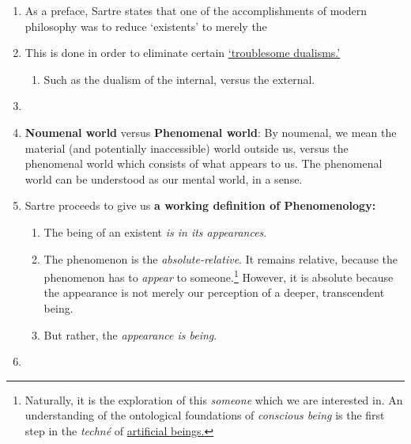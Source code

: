 \begin{enumerate}
  \item As a preface, Sartre states that one of the accomplishments of modern philosophy was to reduce \enquote*{existents} to merely the 
  \item This is done in order to eliminate certain \href{https://plato.stanford.edu/entries/dualism/#ProForDua}{\enquote*{troublesome dualisms.}}
  \begin{enumerate}
    \item Such as the dualism of the internal, versus the external.
  \end{enumerate}
  \item {}
  \item \textbf{Noumenal world} versus \textbf{Phenomenal world}:
  By noumenal, we mean the material (and potentially inaccessible) world outside us, versus the phenomenal world which consists of what appears to us. The phenomenal world can be understood as our mental world, in a sense.
  \item Sartre proceeds to give us \textbf{a working definition of Phenomenology:}
  \begin{enumerate}
    \item The being of an existent \emph{is in its appearances}. 
    \item The phenomenon is the \emph{absolute-relative}.
    It remains relative, because the phenomenon has to \emph{appear} to someone.\footnote{Naturally, it is the exploration of this \emph{someone} which we are interested in. An understanding of the ontological foundations of \emph{conscious being} is the first step in the \emph{techné} of \href{https://plato.stanford.edu/entries/artificial-intelligence/}{artificial beings.}} However, it is absolute because the appearance is not merely our perception of a deeper, transcendent being.
    \item But rather, the \emph{appearance is being}.
  \end{enumerate}
  \item {}

\end{enumerate}
